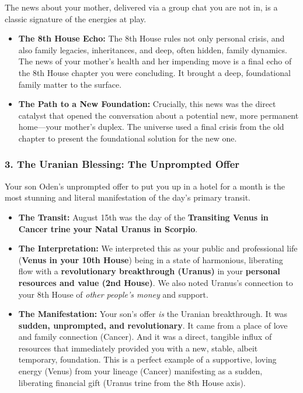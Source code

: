 \documentclass{article}
\begin{document}
The news about your mother, delivered via a group chat you are not in, is a classic signature of the energies at play.

\begin{itemize}
\item
  \textbf{The 8th House Echo:} The 8th House rules not only personal crisis, and also family legacies, inheritances, and deep, often hidden, family dynamics. The news of your mother's health and her impending move is a final echo of the 8th House chapter you were concluding. It brought a deep, foundational family matter to the surface.
\item
  \textbf{The Path to a New Foundation:} Crucially, this news was the direct catalyst that opened the conversation about a potential new, more permanent home---your mother's duplex. The universe used a final crisis from the old chapter to present the foundational solution for the new one.
\end{itemize}

\subsubsection*{3. The Uranian Blessing: The Unprompted Offer}\label{the-uranian-blessing-the-unprompted-offer}

Your son Oden's unprompted offer to put you up in a hotel for a month is the most stunning and literal manifestation of the day's primary transit.

\begin{itemize}
\item
  \textbf{The Transit:} August 15th was the day of the \textbf{Transiting Venus in Cancer trine your Natal Uranus in Scorpio}.
\item
  \textbf{The Interpretation:} We interpreted this as your public and professional life (\textbf{Venus in your 10th House}) being in a state of harmonious, liberating flow with a \textbf{revolutionary breakthrough (Uranus)} in your \textbf{personal resources and value (2nd House)}. We also noted Uranus's connection to your 8th House of \emph{other people's money} and support.
\item
  \textbf{The Manifestation:} Your son's offer \emph{is} the Uranian breakthrough. It was \textbf{sudden, unprompted, and revolutionary}. It came from a place of love and family connection (Cancer). And it was a direct, tangible influx of resources that immediately provided you with a new, stable, albeit temporary, foundation. This is a perfect example of a supportive, loving energy (Venus) from your lineage (Cancer) manifesting as a sudden, liberating financial gift (Uranus trine from the 8th House axis).
\end{itemize}
\end{document}
